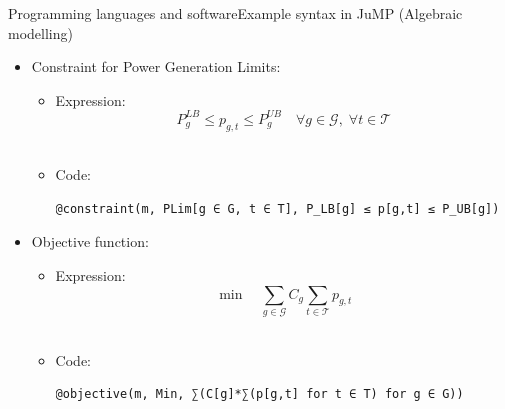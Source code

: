 \documentclass[handout]{beamer}
\begin{document}
\begin{frame}[t,fragile]{Programming languages and software}{Example syntax in JuMP (Algebraic modelling)}
\begin{itemize}
\item Constraint for Power Generation Limits:
\begin{itemize}
  \item Expression:
  $$P^{LB}_g \leq p_{g,t} \leq  P^{UB}_g \quad \forall g \in \mathcal{G},\; \forall t \in \mathcal{T}$$\\
  \item Code:
  \hspace{-1.5cm}\begin{Verbatim}[fontsize=\scriptsize]
    @constraint(m, PLim[g ∈ G, t ∈ T], P_LB[g] ≤ p[g,t] ≤ P_UB[g])
  \end{Verbatim}
\end{itemize}\vspace{12pt}
\item Objective function:
\begin{itemize}
  \item Expression:
  $$\min \quad \sum_{g \in \mathcal{G}} C_g \sum_{t \in \mathcal{T}} p_{g,t}$$\\
  \item Code:
  \hspace{-1.5cm}\begin{Verbatim}[fontsize=\scriptsize]
    @objective(m, Min, ∑(C[g]*∑(p[g,t] for t ∈ T) for g ∈ G))
  \end{Verbatim}
\end{itemize}

\end{itemize}

\end{frame}

\end{document}
